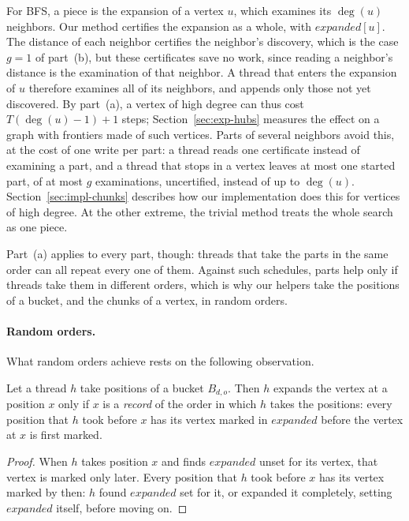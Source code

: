 For BFS, a piece is the expansion of a vertex $u$, which examines its $\deg(u)$ neighbors. Our method certifies the expansion as a whole, with $\mathit{expanded}[u]$. The distance of each neighbor certifies the neighbor's discovery, which is the case $g = 1$ of part~(b), but these certificates save no work, since reading a neighbor's distance is the examination of that neighbor. A thread that enters the expansion of $u$ therefore examines all of its neighbors, and appends only those not yet discovered. By part~(a), a vertex of high degree can thus cost $T(\deg(u)-1)+1$ steps; Section~\ref{sec:exp-hubs} measures the effect on a graph with frontiers made of such vertices. Parts of several neighbors avoid this, at the cost of one write per part: a thread reads one certificate instead of examining a part, and a thread that stops in a vertex leaves at most one started part, of at most $g$ examinations, uncertified, instead of up to $\deg(u)$. Section~\ref{sec:impl-chunks} describes how our implementation does this for vertices of high degree. At the other extreme, the trivial method treats the whole search as one piece.

Part~(a) applies to every part, though: threads that take the parts in the same order can all repeat every one of them. Against such schedules, parts help only if threads take them in different orders, which is why our helpers take the positions of a bucket, and the chunks of a vertex, in random orders.

\paragraph{Random orders.} What random orders achieve rests on the following observation.

\begin{lemma}[Records]
\label{lem:records}
Let a thread $h$ take positions of a bucket $B_{d,o}$. Then $h$ expands the vertex at a position $x$ only if $x$ is a \emph{record} of the order in which $h$ takes the positions: every position that $h$ took before $x$ has its vertex marked in $\mathit{expanded}$ before the vertex at $x$ is first marked.
\end{lemma}
\begin{proof}
When $h$ takes position $x$ and finds $\mathit{expanded}$ unset for its vertex, that vertex is marked only later. Every position that $h$ took before $x$ has its vertex marked by then: $h$ found $\mathit{expanded}$ set for it, or expanded it completely, setting $\mathit{expanded}$ itself, before moving on.
\end{proof}

